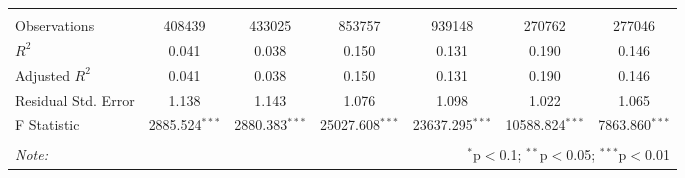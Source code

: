 \begin{tabular}{@{\extracolsep{5pt}}lcccccc}
\hline \\[-1.8ex]
 Observations & 408439 & 433025 & 853757 & 939148 & 270762 & 277046 \\
 $R^2$ & 0.041 & 0.038 & 0.150 & 0.131 & 0.190 & 0.146 \\
 Adjusted $R^2$ & 0.041 & 0.038 & 0.150 & 0.131 & 0.190 & 0.146 \\
 Residual Std. Error & 1.138  & 1.143  & 1.076  & 1.098  & 1.022  & 1.065  \\
 F Statistic & 2885.524$^{***}$  & 2880.383$^{***}$  & 25027.608$^{***}$  & 23637.295$^{***}$  & 10588.824$^{***}$  & 7863.860$^{***}$  \\
\hline
\hline \\[-1.8ex]
\textit{Note:} & \multicolumn{6}{r}{$^{*}$p$<$0.1; $^{**}$p$<$0.05; $^{***}$p$<$0.01} \\
\end{tabular}
